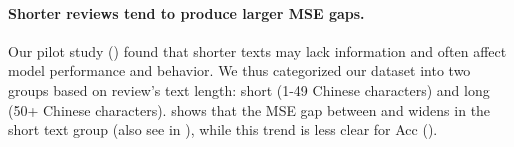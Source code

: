 \paragraph{Shorter reviews tend to produce larger MSE gaps.}
Our pilot study () found that shorter texts may lack information and often affect model performance and behavior.
We thus categorized our dataset into two groups based on review's text length: 
short (1-49 Chinese characters) and long (50+ Chinese characters). 
 shows that the MSE gap between \twChinese and \cnChinese widens in the short text group (also see  in ), while this trend is less clear for Acc ().





